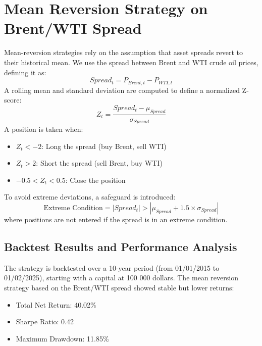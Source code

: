 \documentclass[11pt, oneside, a4paper, titlepage]{report}
\begin{document}
\section{Mean Reversion Strategy on Brent/WTI Spread}
Mean-reversion strategies rely on the assumption that asset spreads revert to their historical mean. We use the spread between Brent and WTI crude oil prices, defining it as:
\begin{equation}
    Spread_t = P_{Brent, t} - P_{WTI, t}
\end{equation}
A rolling mean and standard deviation are computed to define a normalized Z-score:
\begin{equation}
    Z_t = \frac{Spread_t - \mu_{Spread}}{\sigma_{Spread}}
\end{equation}
A position is taken when:
\begin{itemize}
    \item $Z_t < -2$: Long the spread (buy Brent, sell WTI)
    \item $Z_t > 2$: Short the spread (sell Brent, buy WTI)
    \item $-0.5 < Z_t < 0.5$: Close the position
\end{itemize}
To avoid extreme deviations, a safeguard is introduced:
\begin{equation}
    \text{Extreme Condition} = |Spread_t| > |\mu_{Spread} + 1.5 \times \sigma_{Spread}|
\end{equation}
where positions are not entered if the spread is in an extreme condition.


\subsection{Backtest Results and Performance Analysis}
The strategy is backtested over a 10-year period (from 01/01/2015 to 01/02/2025), starting with a capital at 100 000 dollars.
The mean reversion strategy based on the Brent/WTI spread showed stable but lower returns:

\begin{itemize}
    \item Total Net Return: 40.02\%
    \item Sharpe Ratio: 0.42
    \item Maximum Drawdown: 11.85\%
\end{itemize}

\newpage
\end{document}
